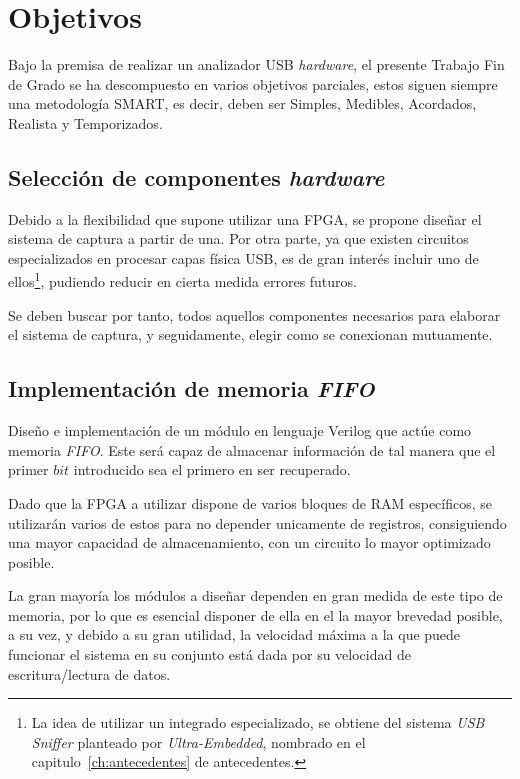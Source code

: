 \chapter{Objetivos}
\label{ch:objetivos}

Bajo la premisa de realizar un analizador USB \emph{hardware}, el presente Trabajo Fin de Grado se ha descompuesto en varios objetivos parciales, estos siguen siempre una metodología SMART, es decir, deben ser Simples, Medibles, Acordados, Realista y Temporizados.

\section{Selección de componentes \emph{hardware}}
Debido a la flexibilidad que supone utilizar una FPGA\cite{monmasson2007fpga}, se propone diseñar el sistema de captura a partir de una. Por otra parte, ya que existen circuitos especializados en procesar capas física USB, es de gran interés incluir uno de ellos\footnote{La idea de utilizar un integrado especializado, se obtiene del sistema \emph{USB Sniffer} planteado por \emph{Ultra-Embedded}, nombrado en el capitulo~\ref{ch:antecedentes} de antecedentes.}, pudiendo reducir en cierta medida errores futuros.

Se deben buscar por tanto, todos aquellos componentes necesarios para elaborar el sistema de captura, y seguidamente, elegir como se conexionan mutuamente.

\section{Implementación de memoria \emph{FIFO}}
Diseño e implementación de un módulo en lenguaje Verilog que actúe como memoria \emph{FIFO}. Este será capaz de almacenar información de tal manera que el primer $bit$ introducido sea el primero en ser recuperado.

Dado que la FPGA a utilizar dispone de varios bloques de RAM específicos, se utilizarán varios de estos para no depender unicamente de registros, consiguiendo una mayor capacidad de almacenamiento, con un circuito lo mayor optimizado posible.

La gran mayoría los módulos a diseñar dependen en gran medida de este tipo de memoria, por lo que es esencial disponer de ella en el la mayor brevedad posible, a su vez, y debido a su gran utilidad, la velocidad máxima a la que puede funcionar el sistema en su conjunto está dada por su velocidad de escritura/lectura de datos.

